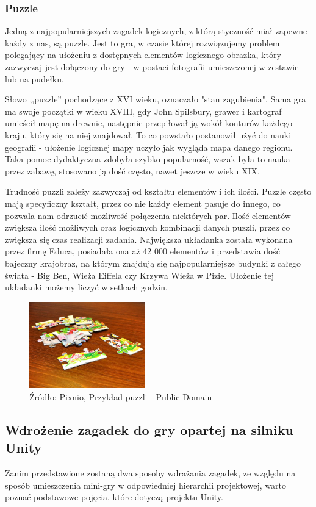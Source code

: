 \documentclass[oneside,polski,logo]{amuthesis}
\begin{document}
\subsubsection{Puzzle}
\par Jedną z najpopularniejszych zagadek logicznych, z którą styczność miał zapewne każdy z nas, są puzzle. Jest to gra, w czasie której rozwiązujemy problem polegający na ułożeniu z dostępnych elementów logicznego obrazka, który zazwyczaj jest dołączony do gry - w postaci fotografii umieszczonej w zestawie lub na pudełku.
 
Słowo ,,puzzle'' pochodzące z XVI wieku, oznaczało "stan zagubienia". Sama gra ma swoje początki w wieku XVIII, gdy John Spilsbury, grawer i kartograf umieścił mapę na drewnie, następnie przepiłował ją wokół konturów każdego kraju, który się na niej znajdował. To co powstało postanowił użyć do nauki geografii - ułożenie logicznej mapy uczyło jak wygląda mapa danego regionu. Taka pomoc dydaktyczna zdobyła szybko popularność, wszak była to nauka przez zabawę, stosowano ją dość często, nawet jeszcze w wieku XIX.  

Trudność puzzli zależy zazwyczaj od kształtu elementów i ich ilości. Puzzle często mają specyficzny kształt, przez co nie każdy element pasuje do innego, co pozwala nam odrzucić możliwość połączenia niektórych par. Ilość elementów zwiększa ilość możliwych oraz logicznych kombinacji danych puzzli, przez co zwiększa się czas realizacji zadania. Największa układanka została wykonana przez firmę Educa, posiadała ona aż 42 000 elementów i przedstawia dość bajeczny krajobraz, na którym znajdują się najpopularniejsze budynki z całego świata - Big Ben, Wieża Eiffela czy Krzywa Wieża w Pizie. Ułożenie tej układanki możemy liczyć w setkach godzin. \cite{puzzle}

\begin{figure}[h]
	\centering
	\includegraphics[width=5cm]{images/tyrek/puzzle.jpg}
	\caption{Źródło: Pixnio, Przykład puzzli - Public Domain}
\end{figure}

\subsection{Wdrożenie zagadek do gry opartej na silniku Unity}
\par Zanim przedstawione zostaną dwa sposoby wdrażania zagadek, ze względu na sposób umieszczenia mini-gry w odpowiedniej hierarchii projektowej, warto poznać podstawowe pojęcia, które dotyczą projektu Unity.
\end{document}
